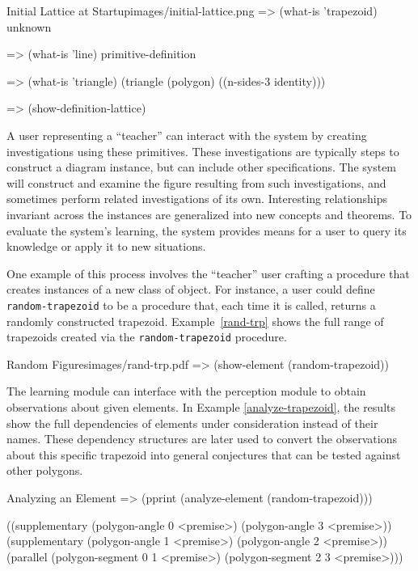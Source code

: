\begin{img-example}
[label=initial-lattice,
breakable=false]
{Initial Lattice at Startup}{images/initial-lattice.png}
=> (what-is 'trapezoid)
unknown

=> (what-is 'line)
primitive-definition

=> (what-is 'triangle)
(triangle (polygon)
          ((n-sides-3 identity)))

=> (show-definition-lattice)
\end{img-example}

A user representing a ``teacher'' can interact with the system by
creating investigations using these primitives. These investigations
are typically steps to construct a diagram instance, but can include
other specifications. The system will construct and examine the figure
resulting from such investigations, and sometimes perform related
investigations of its own. Interesting relationships invariant across
the instances are generalized into new concepts and theorems. To
evaluate the system's learning, the system provides means for a user
to query its knowledge or apply it to new situations.

One example of this process involves the ``teacher'' user crafting a
procedure that creates instances of a new class of object. For
instance, a user could define \texttt{random-trapezoid} to be a
procedure that, each time it is called, returns a randomly constructed
trapezoid. Example~\ref{rand-trp} shows the full range of trapezoids
created via the \texttt{random-trapezoid} procedure.

\begin{pdf-example}
[label=rand-trp,
comment style={frame hidden,opacityback=0,
raster columns=3,graphics pages={1,2,3}}]
{Random Figures}{images/rand-trp.pdf}
=> (show-element (random-trapezoid))
\end{pdf-example}

The learning module can interface with the perception module to obtain
observations about given elements. In Example \ref{analyze-trapezoid},
the results show the full dependencies of elements under consideration
instead of their names. These dependency structures are later used to
convert the observations about this specific trapezoid into general
conjectures that can be tested against other polygons.

\begin{repl-example}
[label=analyze-trapezoid]
{Analyzing an Element}
=> (pprint (analyze-element (random-trapezoid)))

((supplementary (polygon-angle 0 <premise>) (polygon-angle 3 <premise>))
 (supplementary (polygon-angle 1 <premise>) (polygon-angle 2 <premise>))
 (parallel (polygon-segment 0 1 <premise>) (polygon-segment 2 3 <premise>)))
\end{repl-example}


